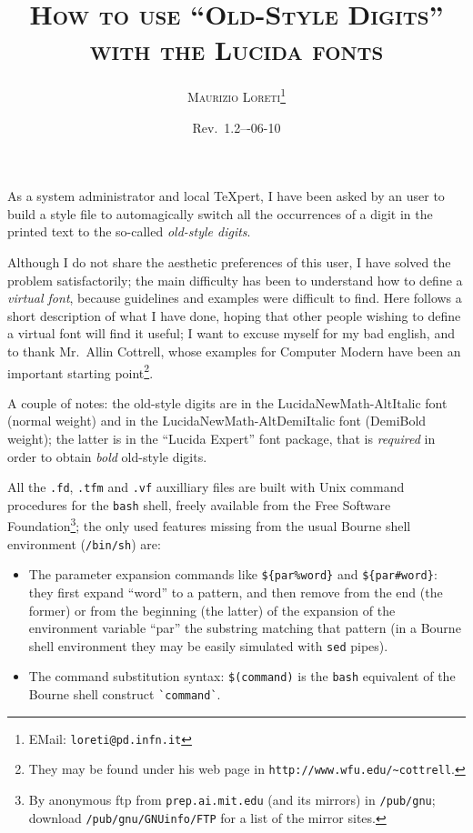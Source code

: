 \documentclass[a4paper]{article}
\begin{document}
\title{\scshape How to use ``Old-Style Digits''\\
  with the Lucida fonts}
\author{\textsc{Maurizio Loreti}\thanks{
  EMail: \texttt{loreti@pd.infn.it}}}
\date{Rev.\ 1.2\quad---06-10}
\maketitle
\noindent As a system administrator and local \TeX pert, I
have been asked by an user to build a style file to
automagically switch all the occurrences of a digit in the
printed text to the so-called \emph{old-style digits}.

Although I do not share the aesthetic preferences of this
user, I have solved the problem satisfactorily; the main
difficulty has been to understand how to define a
\emph{virtual font}, because guidelines and examples were
difficult to find.
Here follows a short description of what I have done, hoping
that other people wishing to define a virtual font will find
it useful; I want to excuse myself for my bad english, and
to thank Mr.\ Allin Cottrell, whose examples for Computer
Modern have been an important starting point\/\footnote{They
  may be found under his web page in
  \texttt{http://www.wfu.edu/\textasciitilde cottrell}.}.

A couple of notes: the old-style digits are in the
LucidaNewMath-AltItalic font (normal weight) and in the
LucidaNewMath-AltDemiItalic font (DemiBold weight); the
latter is in the ``Lucida Expert'' font package, that is
\emph{required} in order to obtain \emph{bold} old-style
digits.

All the \verb|.fd|, \verb|.tfm| and \verb|.vf| auxilliary
files are built with Unix command procedures for the
\verb|bash| shell, freely available from the Free Software
Foundation\/\footnote{By anonymous ftp from
  \texttt{prep.ai.mit.edu} (and its mirrors) in
  \texttt{/pub/gnu}; download \texttt{/pub/gnu/GNUinfo/FTP}
  for a list of the mirror sites.}; the only used features
missing from the usual Bourne shell environment
(\verb|/bin/sh|) are:
\begin{itemize}
\item The parameter expansion commands like
  \texttt{\$\{par\%word\}} and \texttt{\$\{par\#word\}}:
  they first expand ``word'' to a pattern, and then remove
  from the end (the former) or from the beginning (the
  latter) of the expansion of the environment variable
  ``par'' the substring matching that pattern (in a Bourne
  shell environment they may be easily simulated with
  \verb|sed| pipes).
\item The command substitution syntax: \verb|$(command)| is
  the \verb|bash| equivalent of the Bourne shell construct
  \verb|`command`|.
\end{itemize}
\end{document}
